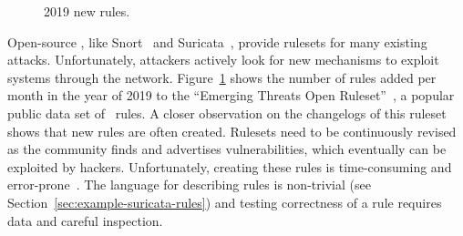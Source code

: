 \documentclass[conference]{IEEEtran}
\begin{document}
\begin{figure}
    \vspace{-4ex}  
    \centering
    \vspace{-5ex}
    \caption{\label{fig:distribution-rules-per-month}2019 new rules.}
\end{figure}
Open-source \nids{}, like Snort~\cite{snort} and
Suricata~\cite{suricata}, provide rulesets for many existing
attacks. Unfortunately, attackers actively look for new mechanisms to
exploit systems through the
network. Figure~\ref{fig:distribution-rules-per-month} shows the
number of rules added per month in the year of 2019 to the ``Emerging
Threats Open Ruleset''~\cite{emerging-threats-open}, a popular public
data set of \suri\ rules. A closer observation on the changelogs of
this ruleset~\cite{emerging-threats-changelogs} shows that new rules
are often created.  Rulesets need to be continuously revised as the
community finds and advertises vulnerabilities, which eventually can
be exploited by hackers.  Unfortunately, creating these rules is
time-consuming and error-prone~\cite{vollmer-etal-cics2011,alparslan-blog-suri}. The language for
describing rules is non-trivial (see
Section~\ref{sec:example-suricata-rules}) and testing correctness of a
rule requires data and careful inspection.

\end{document}

